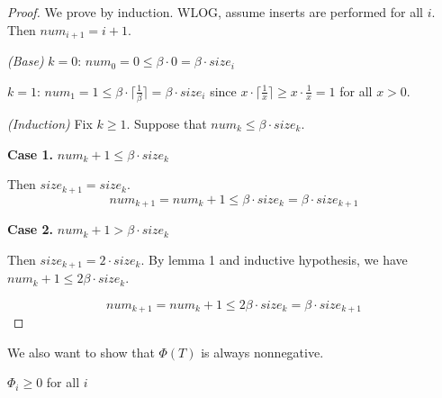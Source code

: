 \begin{proof}
    We prove by induction.
    WLOG, assume inserts are performed for all $i$.
    Then $num_{i+1} = i + 1$.
    
    \textit{(Base)}
    $k = 0$: $num_0 = 0 \leq \beta \cdot 0 = \beta \cdot size_i$

    $k = 1$: $num_1 = 1 \leq \beta \cdot \lceil \frac{1}{\beta} \rceil = \beta \cdot size_i$
    since $x \cdot \lceil \frac{1}{x} \rceil \geq x \cdot \frac{1}{x} = 1$ for all $x > 0$.

    \textit{(Induction)}
    Fix $k \geq 1$.
    Suppose that $num_k \leq \beta \cdot size_k$.

    \textbf{Case 1.}
    $num_k + 1 \leq \beta \cdot size_k$

    Then $size_{k+1} = size_k$.
    \begin{equation*}
        num_{k+1} = num_k + 1 \leq \beta \cdot size_k = \beta \cdot size_{k+1}
    \end{equation*}

    \textbf{Case 2.}
    $num_k + 1 > \beta \cdot size_k$
    
    Then $size_{k+1} = 2 \cdot size_k$.
    By lemma 1 and inductive hypothesis, we have
    $num_k + 1 \leq 2\beta \cdot size_k$.

    \begin{equation*}
        num_{k+1} = num_k + 1 \leq 2\beta \cdot size_k = \beta \cdot size_{k+1}
    \end{equation*}
\end{proof}

We also want to show that $\Phi(T)$ is always nonnegative.

\begin{claim}
    $\Phi_i \geq 0$ for all $i$
\end{claim}

